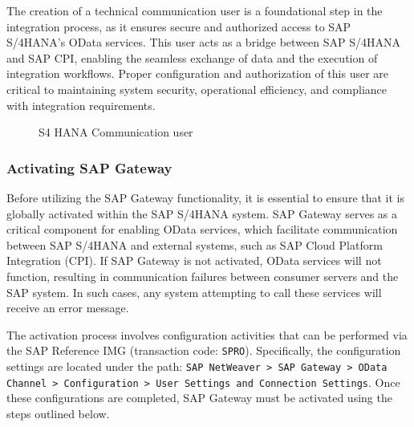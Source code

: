 The creation of a technical communication user is a foundational step in the integration process, as it ensures secure and authorized access to SAP S/4HANA's OData services. This user acts as a bridge between SAP S/4HANA and SAP CPI, enabling the seamless exchange of data and the execution of integration workflows. Proper configuration and authorization of this user are critical to maintaining system security, operational efficiency, and compliance with integration requirements.

    \begin{figure}[H]
    \centering
    \caption{S4 HANA Communication user}
    
\end{figure}


\subsubsection{Activating SAP Gateway }

Before utilizing the SAP Gateway functionality, it is essential to ensure that it is globally activated within the SAP S/4HANA system. SAP Gateway serves as a critical component for enabling OData services, which facilitate communication between SAP S/4HANA and external systems, such as SAP Cloud Platform Integration (CPI). If SAP Gateway is not activated, OData services will not function, resulting in communication failures between consumer servers and the SAP system. In such cases, any system attempting to call these services will receive an error message. 

The activation process involves configuration activities that can be performed via the SAP Reference IMG (transaction code: \texttt{SPRO}). Specifically, the configuration settings are located under the path: \texttt{SAP NetWeaver > SAP Gateway > OData Channel > Configuration > User Settings and Connection Settings}. Once these configurations are completed, SAP Gateway must be activated using the steps outlined below.

